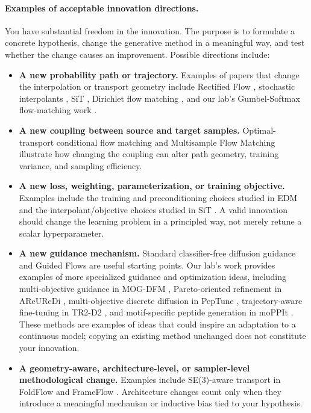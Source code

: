 \documentclass{article}
\begin{document}
\paragraph{Examples of acceptable innovation directions.}
You have substantial freedom in the innovation. The purpose is to formulate a concrete hypothesis, change the generative method in a meaningful way, and test whether the change causes an improvement. Possible directions include:
\begin{itemize}[leftmargin=*]
    \item \textbf{A new probability path or trajectory.} Examples of papers that change the interpolation or transport geometry include Rectified Flow \citep{liu2022flow}, stochastic interpolants \citep{albergo2025stochastic}, SiT \citep{ma2024sit}, Dirichlet flow matching \citep{stark2024dirichlet}, and our lab's Gumbel-Softmax flow-matching work \citep{tang2025gumbel}.
    \item \textbf{A new coupling between source and target samples.} Optimal-transport conditional flow matching \citep{tong2023improving} and Multisample Flow Matching \citep{pooladian2023multisample} illustrate how changing the coupling can alter path geometry, training variance, and sampling efficiency.
    \item \textbf{A new loss, weighting, parameterization, or training objective.} Examples include the training and preconditioning choices studied in EDM \citep{karras2022elucidating} and the interpolant/objective choices studied in SiT \citep{ma2024sit}. A valid innovation should change the learning problem in a principled way, not merely retune a scalar hyperparameter.
    \item \textbf{A new guidance mechanism.} Standard classifier-free diffusion guidance \citep{ho2022classifier} and Guided Flows \citep{zheng2023guided} are useful starting points. Our lab's work provides examples of more specialized guidance and optimization ideas, including multi-objective guidance in MOG-DFM \citep{chen2025multi}, Pareto-oriented refinement in AReUReDi \citep{chen2025areuredi}, multi-objective discrete diffusion in PepTune \citep{tang2025peptune}, trajectory-aware fine-tuning in TR2-D2 \citep{tang2025tr2}, and motif-specific peptide generation in moPPIt \citep{chen2024moppit}. These methods are examples of ideas that could inspire an adaptation to a continuous model; copying an existing method unchanged does not constitute your innovation.
    \item \textbf{A geometry-aware, architecture-level, or sampler-level methodological change.} Examples include SE(3)-aware transport in FoldFlow \citep{bose2024se} and FrameFlow \citep{yim2023fast}. Architecture changes count only when they introduce a meaningful mechanism or inductive bias tied to your hypothesis.
\end{itemize}
\end{document}
